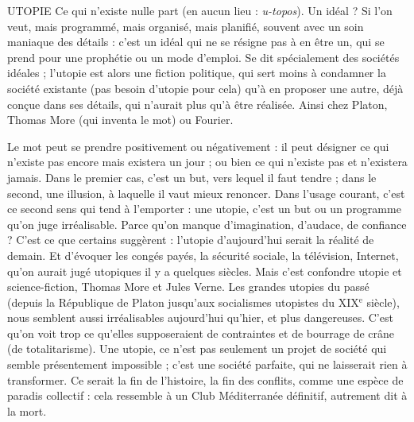 UTOPIE Ce qui n’existe nulle part (en aucun lieu : {\it u-topos}). Un idéal ? Si
l’on veut, mais programmé, mais organisé, mais planifié, souvent
avec un soin maniaque des détails : c’est un idéal qui ne se résigne pas à en être
un, qui se prend pour une prophétie ou un mode d’emploi. Se dit spécialement
des sociétés idéales ; l’utopie est alors une fiction politique, qui sert moins à
condamner la société existante (pas besoin d’utopie pour cela) qu’à en proposer
une autre, déjà conçue dans ses détails, qui n’aurait plus qu’à être réalisée. Ainsi
chez Platon, Thomas More (qui inventa le mot) ou Fourier.

Le mot peut se prendre positivement ou négativement : il peut désigner ce
qui n’existe pas encore mais existera un jour ; ou bien ce qui n’existe pas et
n’existera jamais. Dans le premier cas, c’est un but, vers lequel il faut tendre ;
dans le second, une illusion, à laquelle il vaut mieux renoncer. Dans l’usage
courant, c’est ce second sens qui tend à l'emporter : une utopie, c’est un but ou
un programme qu'on juge irréalisable. Parce qu’on manque d’imagination,
d’audace, de confiance ? C’est ce que certains suggèrent : l'utopie d’aujourd’hui
serait la réalité de demain. Et d’évoquer les congés payés, la sécurité sociale, la
télévision, Internet, qu’on aurait jugé utopiques il y a quelques siècles. Mais
c’est confondre utopie et science-fiction, Thomas More et Jules Verne. Les
grandes utopies du passé (depuis la République de Platon jusqu’aux socialismes
utopistes du {\footnotesize XIX$^\text{e}$} siècle), nous semblent aussi irréalisables aujourd’hui qu’hier,
et plus dangereuses. C’est qu’on voit trop ce qu’elles supposeraient de
contraintes et de bourrage de crâne (de totalitarisme). Une utopie, ce n’est pas
seulement un projet de société qui semble présentement impossible ; c’est une
société parfaite, qui ne laisserait rien à transformer. Ce serait la fin de l’histoire,
la fin des conflits, comme une espèce de paradis collectif : cela ressemble à un
Club Méditerranée définitif, autrement dit à la mort.

